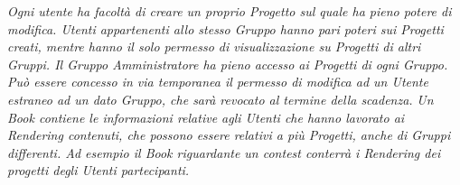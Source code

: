 \documentclass[a4paper,12pt]{report}
\begin{document}
{\it Ogni utente ha facoltà di creare un proprio Progetto sul quale ha pieno potere di modifica. Utenti appartenenti allo stesso Gruppo hanno pari poteri sui Progetti creati, mentre hanno il solo permesso di visualizzazione su Progetti di altri Gruppi. Il Gruppo Amministratore ha pieno accesso ai Progetti di ogni Gruppo. Può essere concesso in via temporanea il permesso di modifica ad un Utente estraneo ad un dato Gruppo, che sarà revocato al termine della scadenza.}
{\it Un Book contiene le informazioni relative agli Utenti che hanno lavorato ai Rendering contenuti, che possono essere relativi a più Progetti, anche di Gruppi differenti. Ad esempio il Book riguardante un contest conterrà i Rendering dei progetti degli Utenti partecipanti.}
\end{document}
